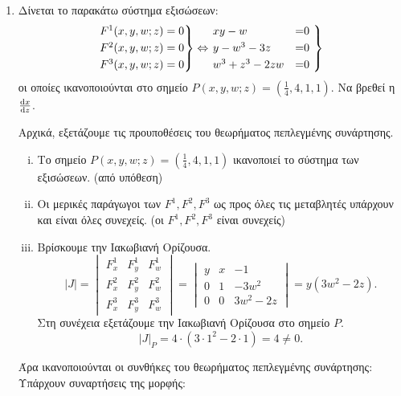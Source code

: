 \documentclass[a4paper,12pt]{article}
\begin{document}
\begin{center}
\end{center}

\vspace{\baselineskip}


\begin{enumerate}

\item Δίνεται το παρακάτω σύστημα εξισώσεων:
\[
\begin{rcases*}
F^1(x,y,w;z)=0 \\
F^2(x,y,w;z)=0 \\
F^3(x,y,w;z)=0
\end{rcases*}
\Leftrightarrow
\begin{rcases*}
xy-w &=0 \\
y-w^3-3z &=0 \\
w^3 + z^3 -2zw &=0
\end{rcases*}
\]
οι οποίες ικανοποιούνται στο σημείο $P(x,y,w;z)=(\frac{1}{4},4,1,1)$. Να βρεθεί η $\dv{x}{z}$.


Αρχικά, εξετάζουμε τις προυποθέσεις του θεωρήματος πεπλεγμένης συνάρτησης.

\begin{enumerate}[i)]
\item Το σημείο $P(x,y,w;z)=(\frac{1}{4},4,1,1)$ ικανοποιεί το σύστημα των εξισώσεων. (από υπόθεση) 
\item Οι μερικές παράγωγοι των $F^1, F^2, F^3$ ως προς όλες τις μεταβλητές υπάρχουν και είναι όλες συνεχείς. (οι $F^1, F^2, F^3$ είναι συνεχείς)
\item Βρίσκουμε την Ιακωβιανή Ορίζουσα.
\[
|J|=
\begin{vmatrix}
F^1_x & F^1_y & F^1_w \\
F^2_x & F^2_y & F^2_w \\
F^3_x & F^3_y & F^3_w
\end{vmatrix} = \begin{vmatrix}
y & x & -1 \\
0 & 1 & -3w^2 \\
0 & 0 & 3w^2-2z
\end{vmatrix}= y(3w^2-2z).
\]
Στη συνέχεια εξετάζουμε την Ιακωβιανή Ορίζουσα στο σημείο $P$.
\[
|J|_P=4\cdot(3\cdot 1^2-2\cdot 1)=4\neq 0.
\]
\end{enumerate}

Άρα ικανοποιούνται οι συνθήκες του θεωρήματος πεπλεγμένης συνάρτησης:
Υπάρχουν συναρτήσεις της μορφής:


\end{enumerate}
\end{document}
